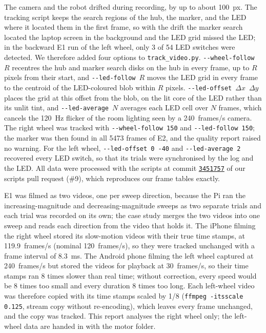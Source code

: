 The camera and the robot drifted during recording, by up to about 100~px. The tracking script keeps the search regions of the hub, the marker, and the LED where it located them in the first frame, so with the drift the marker search located the laptop screen in the background and the LED grid missed the LED; in the backward E1 run of the left wheel, only 3 of 54 LED switches were detected. We therefore added four options to \texttt{track\_video.py}. \texttt{-{}-wheel-follow}~$R$ recentres the hub and marker search disks on the hub in every frame, up to $R$ pixels from their start, and \texttt{-{}-led-follow}~$R$ moves the LED grid in every frame to the centroid of the LED-coloured blob within $R$ pixels. \texttt{-{}-led-offset}~$\Delta x$~$\Delta y$ places the grid at this offset from the blob, on the lit core of the LED rather than its unlit tint, and \texttt{-{}-led-average}~$N$ averages each LED cell over $N$ frames, which cancels the 120~Hz flicker of the room lighting seen by a 240~frames/s camera. The right wheel was tracked with \texttt{-{}-wheel-follow 150} and \texttt{-{}-led-follow 150}; the marker was then found in all 5473 frames of E2, and the quality report raised no warning. For the left wheel, \texttt{-{}-led-offset 0 -40} and \texttt{-{}-led-average 2} recovered every LED switch, so that its trials were synchronised by the log and the LED. All data were processed with the scripts at commit \href{https://github.com/nordlinglab/course-automatic-control-experiment-duckiebot/pull/9/commits/3451757}{\texttt{3451757}} of our scripts pull request (\#9), which reproduces our frame tables exactly.

E1 was filmed as two videos, one per sweep direction, because the Pi ran the increasing-magnitude and decreasing-magnitude sweeps as two separate trials and each trial was recorded on its own; the case study merges the two videos into one sweep and reads each direction from the video that holds it. The iPhone filming the right wheel stored its slow-motion videos with their true time stamps, at 119.9~frames/s (nominal 120~frames/s), so they were tracked unchanged with a frame interval of 8.3~ms. The Android phone filming the left wheel captured at 240~frames/s but stored the videos for playback at 30~frames/s, so their time stamps ran 8 times slower than real time; without correction, every speed would be 8 times too small and every duration 8 times too long. Each left-wheel video was therefore copied with its time stamps scaled by 1/8 (\texttt{ffmpeg -itsscale 0.125}, stream copy without re-encoding), which leaves every frame unchanged, and the copy was tracked. This report analyses the right wheel only; the left-wheel data are handed in with the motor folder.

